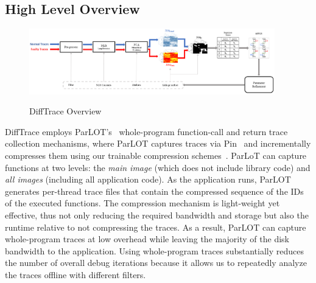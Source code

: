 \subsection{High Level Overview}

\begin{figure}[]
\caption{DiffTrace Overview}
\includegraphics[width=0.95\textwidth]{figs/overview.png}
\label{fig.diffTraceOverview}
\end{figure}

DiffTrace employs
ParLOT's~\cite{parlot} whole-program function-call and return trace collection
mechanisms, where ParLOT captures traces
via Pin~\cite{pin} and incrementally compresses them using our trainable
compression schemes~\cite{martin-compression-paper}.
%
ParLoT can capture functions at two levels:
the \textit{main image} (which does not include library code)
and \textit{all images} (including all application code).
%
As the application runs,
ParLOT generates per-thread trace files that
contain the compressed sequence of the IDs of the executed functions.
%
The compression mechanism is light-weight yet effective,
thus not only reducing the required bandwidth and storage but also the
runtime relative to not compressing the traces.
As a result, ParLOT can capture whole-program traces at low overhead
while leaving the majority of the disk bandwidth to the application. 
%
Using whole-program traces substantially reduces the number of overall
debug iterations because it allows us to repeatedly analyze the
traces offline with different filters.


